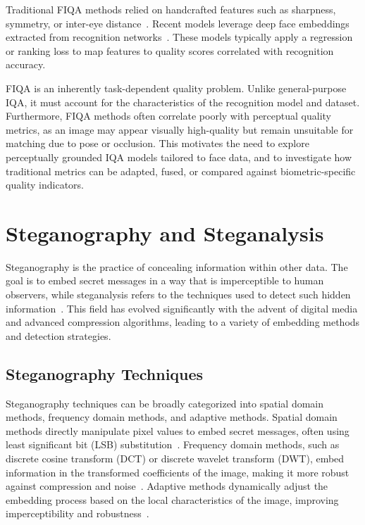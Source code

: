 Traditional FIQA methods relied on handcrafted features such as sharpness, symmetry, or inter-eye distance~\cite{grother2003facequality}. Recent models leverage deep face embeddings extracted from recognition networks~\cite{terhorst2020serfiq, terhorst2022quality}. These models typically apply a regression or ranking loss to map features to quality scores correlated with recognition accuracy.

FIQA is an inherently task-dependent quality problem. Unlike general-purpose IQA, it must account for the characteristics of the recognition model and dataset. Furthermore, FIQA methods often correlate poorly with perceptual quality metrics, as an image may appear visually high-quality but remain unsuitable for matching due to pose or occlusion. This motivates the need to explore perceptually grounded IQA models tailored to face data, and to investigate how traditional metrics can be adapted, fused, or compared against biometric-specific quality indicators.

\section{Steganography and Steganalysis}\label{sec:steganography}

Steganography is the practice of concealing information within other data. The goal is to embed secret messages in a way that is imperceptible to human observers, while steganalysis refers to the techniques used to detect such hidden information~\cite{steganography}. This field has evolved significantly with the advent of digital media and advanced compression algorithms, leading to a variety of embedding methods and detection strategies.
\subsection{Steganography Techniques}\label{sec:steganography_techniques}
Steganography techniques can be broadly categorized into spatial domain methods, frequency domain methods, and adaptive methods. Spatial domain methods directly manipulate pixel values to embed secret messages, often using least significant bit (LSB) substitution~\cite{steganography2017}. Frequency domain methods, such as discrete cosine transform (DCT) or discrete wavelet transform (DWT), embed information in the transformed coefficients of the image, making it more robust against compression and noise~\cite{zhang2017survey}. Adaptive methods dynamically adjust the embedding process based on the local characteristics of the image, improving imperceptibility and robustness~\cite{li2018adaptive}.
